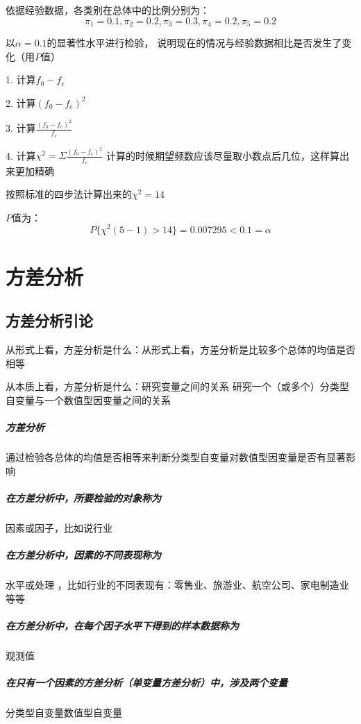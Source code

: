 \documentclass[UTF8,10pt]{book}
\begin{document}
{依据经验数据，各类别在总体中的比例分别为： 
$$ \pi_1 = 0.1 , \pi_2 = 0.2 , \pi_3 = 0.3 , \pi_4 = 0.2 , \pi_5 = 0.2 $$ 

以$\alpha=0.1$的显著性水平进行检验，
说明现在的情况与经验数据相比是否发生了变化（用$P$值）	

1. 计算$f_0 -f_e$ 

2. 计算$(f_0 -f_e)^2$ 

3. 计算$\frac{(f_0 -f_e)^2}{f_e}$ 

4. 计算$\chi^2 = \Sigma \frac{(f_0-f_e)^2}{f_e} $ 
计算的时候期望频数应该尽量取小数点后几位，这样算出来更加精确 

按照标准的四步法计算出来的$\chi^2 = 14$ 

$P$值为： 
$$ P\{\chi^2(5-1)>14\}=0.007295<0.1=\alpha $$	


}


\clearpage
\chapter{方差分析}

\section{方差分析引论}
从形式上看，方差分析是什么：{\kaishu 从形式上看，方差分析是比较多个总体的均值是否相等}

从本质上看，方差分析是什么：{\kaishu 研究变量之间的关系 研究一个（或多个）分类型自变量与一个数值型因变量之间的关系}

\paragraph{方差分析}	通过检验各总体的均值是否相等来判断分类型自变量对数值型因变量是否有显著影响
\paragraph{在方差分析中，所要检验的对象称为}	因素或因子，比如说行业
\paragraph{在方差分析中，因素的不同表现称为}	水平或处理 ，比如行业的不同表现有：零售业、旅游业、航空公司、家电制造业等等
\paragraph{在方差分析中，在每个因子水平下得到的样本数据称为}	观测值
\paragraph{在只有一个因素的方差分析（单变量方差分析）中，涉及两个变量}	分类型自变量数值型自变量
\end{document}
